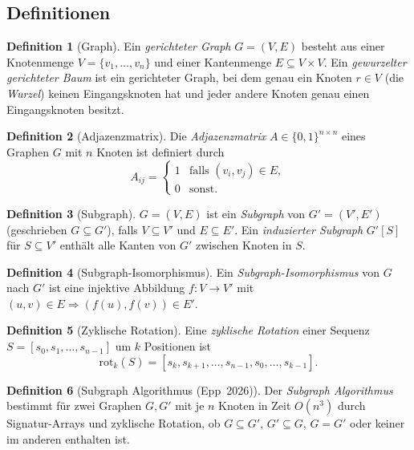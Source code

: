 ﻿\documentclass[a4paper,12pt]{article}
\theoremstyle{definition}
\newtheorem{definition}{Definition}
\begin{document}
\subsection{Definitionen}

\begin{definition}[Graph]
Ein \emph{gerichteter Graph} $G = (V, E)$ besteht aus einer
Knotenmenge $V = \{v_1, \ldots, v_n\}$ und einer Kantenmenge
$E \subseteq V \times V$.  Ein \emph{gewurzelter gerichteter Baum}
ist ein gerichteter Graph, bei dem genau ein Knoten $r \in V$
(die \emph{Wurzel}) keinen Eingangsknoten hat und jeder andere
Knoten genau einen Eingangsknoten besitzt.
\end{definition}

\begin{definition}[Adjazenzmatrix]
Die \emph{Adjazenzmatrix} $A \in \{0,1\}^{n \times n}$ eines
Graphen $G$ mit $n$ Knoten ist definiert durch
\[
A_{ij} = \begin{cases}
1 & \text{falls } (v_i, v_j) \in E,\\
0 & \text{sonst.}
\end{cases}
\]
\end{definition}

\begin{definition}[Subgraph]
$G = (V, E)$ ist ein \emph{Subgraph} von $G' = (V', E')$
(geschrieben $G \subseteq G'$), falls $V \subseteq V'$ und
$E \subseteq E'$.  Ein \emph{induzierter Subgraph} $G'[S]$
f\"ur $S \subseteq V'$ enth\"alt alle Kanten von $G'$ zwischen
Knoten in $S$.
\end{definition}

\begin{definition}[Subgraph-Isomorphismus]
\label{def:si}
Ein \emph{Subgraph-Isomorphismus} von $G$ nach $G'$ ist eine
injektive Abbildung $f\colon V \to V'$ mit
$(u, v) \in E \Rightarrow (f(u), f(v)) \in E'$.
\end{definition}

\begin{definition}[Zyklische Rotation]
Eine \emph{zyklische Rotation} einer Sequenz
$S = [s_0, s_1, \ldots, s_{n-1}]$ um $k$ Positionen ist
\[
\mathrm{rot}_k(S) = [s_k, s_{k+1}, \ldots, s_{n-1}, s_0, \ldots, s_{k-1}].
\]
\end{definition}

\begin{definition}[Subgraph Algorithmus (Epp~2026)]
\label{def:subgraph}
Der \emph{Subgraph Algorithmus} bestimmt f\"ur zwei Graphen
$G, G'$ mit je $n$ Knoten in Zeit $O(n^3)$ durch
Signatur-Arrays und zyklische Rotation, ob
$G \subseteq G'$, $G' \subseteq G$, $G = G'$ oder keiner
im anderen enthalten ist.
\end{definition}
\end{document}
